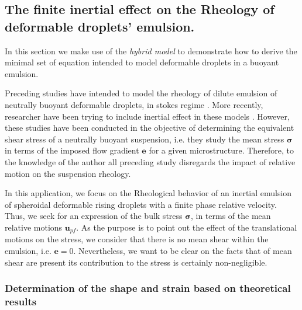 \subsection{
    The finite inertial effect on the Rheology of deformable droplets' emulsion.
    }

In this section we make use of the \textit{hybrid model} to demonstrate how to derive the minimal set of equation intended to model deformable droplets in a buoyant emulsion. 

Preceding studies have intended to model the rheology of dilute emulsion of neutrally buoyant deformable droplets, in stokes regime \citep{goddard1967nonlinear,lhuillier1987phenomenology,maffettone1998equation}.
More recently, researcher have been trying to include inertial effect in these models \citet{raja2010inertial,mwasame2018macroscopic}. 
However, these studies have been conducted in the objective of determining the equivalent shear stress of a neutrally buoyant suspension, i.e. they study the mean stress $\bm{\sigma}$ in terms of the imposed flow gradient $\textbf{e}$ for a given microstructure. 
Therefore, to the knowledge of the author all preceding study disregards the impact of relative motion on the suspension rheology. 

In this application, we focus on the Rheological behavior of an inertial emulsion of spheroidal deformable rising droplets with a finite phase relative velocity. 
Thus, we seek for an expression of the bulk stress $\bm{\sigma}$, in terms of the mean relative motions $\textbf{u}_{pf}$. 
As the purpose is to point out the effect of the translational motions on the stress, we consider that there is no mean shear within the emulsion, i.e. $\textbf{e} = 0$. 
Nevertheless, we want to be clear on the facts that of mean shear are present its contribution to the stress is certainly non-negligible. 

\subsubsection*{Determination of the shape and strain based on \citet{taylor1964deformation} theoretical results}


